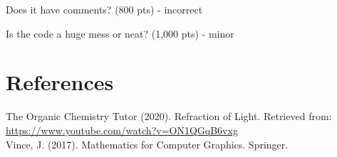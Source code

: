 \documentclass[12pt]{article}
\begin{document}
	Does it have comments? (800 pts) - incorrect
	
	Is the code a huge mess or neat? (1,000 pts) - minor

	\section{References}

	
	The Organic Chemistry Tutor (2020). Refraction of Light. Retrieved from: \url{https://www.youtube.com/watch?v=ON1QGqB6vxg}\\
	
	Vince, J. (2017). Mathematics for Computer Graphics. Springer.
	
	
	
	
	
	
	





	
\end{document}
